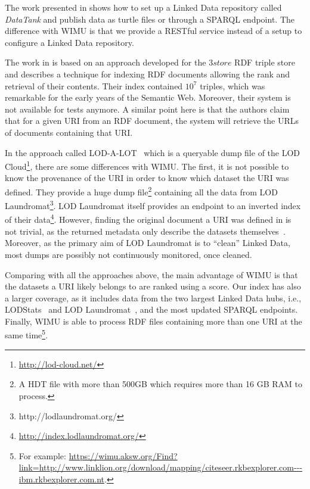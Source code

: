 The work presented in \cite{colpaert2014painless} shows how to set up a Linked Data repository called \emph{DataTank} and publish data as turtle files or through a SPARQL endpoint.
The difference with WIMU is that we provide a RESTful service instead of a setup to configure a Linked Data repository.

The work in \cite{harris2004semindex} is based on an approach developed for the $3store$ RDF triple store and describes a technique for indexing RDF documents allowing the rank and retrieval of their contents. 
Their index contained $10^7$ triples, which was remarkable for the early years of the Semantic Web.
Moreover, their system is not available for tests anymore.
A similar point here is that the authors claim that for a given URI from an RDF document, the system will retrieve the URLs of documents containing that URI.

In the approach called LOD-A-LOT~\cite{fernandez2017lod} which is a queryable dump file of the LOD Cloud\footnote{\url{http://lod-cloud.net/}}, there are some differences with WIMU.
The first, it is not possible to know the provenance of the URI in order to know which dataset the URI was defined. 
They provide a huge dump file\footnote{A HDT file with more than 500GB which requires more than 16 GB RAM to process.} containing all the data from LOD Laundromat\footnote{http://lodlaundromat.org/}.
LOD Laundromat itself provides an endpoint to an inverted index of their data\footnote{\url{http://index.lodlaundromat.org/}}.
However, finding the original document a URI was defined in is not trivial, as the returned metadata only describe the datasets themselves~\cite{beek2014lod}.
Moreover, as the primary aim of LOD Laundromat is to ``clean'' Linked Data, most dumps are possibly not continuously monitored, once cleaned.

Comparing with all the approaches above, the main advantage of WIMU is that the datasets a URI likely belongs to are ranked using a score.
Our index has also a larger coverage, as it includes data from the two largest Linked Data hubs, i.e., LODStats~\cite{auer2012lodstats} and LOD Laundromat~\cite{beek2014lod}, and the most updated SPARQL endpoints.
Finally, WIMU is able to process RDF files containing more than one URI at the same time\footnote{For example: \url{https://wimu.aksw.org/Find?link=http://www.linklion.org/download/mapping/citeseer.rkbexplorer.com---ibm.rkbexplorer.com.nt}.}.

